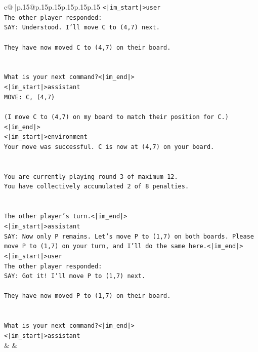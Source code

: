 \documentclass{article}
\begin{document}
{\begin{supertabular}{c@{$\;$}|p{.15\linewidth}@{}p{.15\linewidth}p{.15\linewidth}p{.15\linewidth}p{.15\linewidth}p{.15\linewidth}}
{{{\texttt{<|im\_start|>user} \\
\texttt{The other player responded:} \\
\texttt{SAY: Understood. I'll move C to (4,7) next.} \\
\\ 
\texttt{They have now moved C to (4,7) on their board.} \\
\\ 
\\ 
\texttt{What is your next command?<|im\_end|>} \\
\texttt{<|im\_start|>assistant} \\
\texttt{MOVE: C, (4,7)} \\
\\ 
\texttt{(I move C to (4,7) on my board to match their position for C.)<|im\_end|>} \\
\texttt{<|im\_start|>environment} \\
\texttt{Your move was successful. C is now at (4,7) on your board.} \\
\\ 
\\ 
\texttt{You are currently playing round 3 of maximum 12.} \\
\texttt{You have collectively accumulated 2 of 8 penalties.} \\
\\ 
\\ 
\texttt{The other player's turn.<|im\_end|>} \\
\texttt{<|im\_start|>assistant} \\
\texttt{SAY: Now only P remains. Let's move P to (1,7) on both boards. Please move P to (1,7) on your turn, and I'll do the same here.<|im\_end|>} \\
\texttt{<|im\_start|>user} \\
\texttt{The other player responded:} \\
\texttt{SAY: Got it! I'll move P to (1,7) next.} \\
\\ 
\texttt{They have now moved P to (1,7) on their board.} \\
\\ 
\\ 
\texttt{What is your next command?<|im\_end|>} \\
\texttt{<|im\_start|>assistant} \\
            }
        }
    }
    & & \\ \\


\end{supertabular}}
\end{document}
